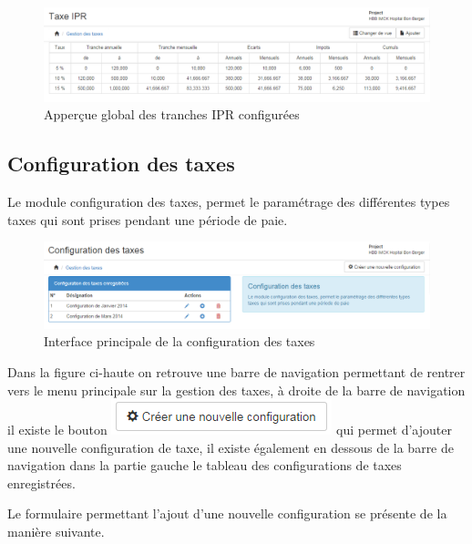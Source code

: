 \documentclass[12pt,a4paper]{report}
\begin{document}
\begin{figure}[h]
\begin{center}
\includegraphics[width=15cm]{pic/ConfigTaxes.png}
\end{center}
\caption{Apperçue global des tranches IPR configurées}
\label{Apperçue global des tranches IPR configurées}
\end{figure}
\newpage
\subsection{Configuration des taxes}
Le module configuration des taxes, permet le paramétrage des différentes types taxes qui sont prises pendant une période de paie.

\begin{figure}[h]
\begin{center}
\includegraphics[width=14cm]{pic/ConfTaxePeriod.png}
\end{center}
\caption{Interface principale de la configuration des taxes}
\label{Interface principale de la configuration des taxes}
\end{figure}

Dans la figure ci-haute on retrouve une barre de navigation permettant de rentrer vers le menu principale sur la gestion des taxes, à droite de la barre de navigation il existe le bouton \includegraphics[scale=1]{pic/CreateNewConfig.png} qui permet d'ajouter une nouvelle configuration de taxe, il existe également en dessous de la barre de navigation dans la partie gauche le tableau des configurations de taxes enregistrées.

Le formulaire permettant l'ajout d'une nouvelle configuration se présente de la manière suivante. 
\end{document}
